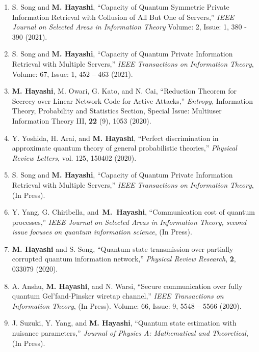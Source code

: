 \documentclass[a4paper,12pt,oneside]{article}
\begin{document}
\begin{enumerate}
\item
S. Song and \textbf{M. Hayashi},
``Capacity of Quantum Symmetric Private Information Retrieval with Collusion of All But One of Servers,''
{\em IEEE Journal on Selected Areas in Information Theory}
Volume: 2, Issue: 1, 380 - 390 (2021).

\item
S. Song and \textbf{M. Hayashi},
``Capacity of Quantum Private Information Retrieval with Multiple Servers,''
{\em IEEE Transactions on Information Theory}, 
Volume: 67, Issue: 1, 452 -- 463 (2021). 

\item 
\textbf{M. Hayashi}, M. Owari, G. Kato, and N. Cai,
``Reduction Theorem for Secrecy over Linear Network
Code for Active Attacks,''
{\em Entropy}, Information Theory, Probability and Statistics Section, Special Issue: Multiuser Information Theory III,  
{\bf 22} (9), 1053 (2020).

\item 
Y. Yoshida, H. Arai, and \textbf{M. Hayashi},
``Perfect discrimination in approximate quantum theory of general probabilistic theories,''
{\em Physical Review Letters}, 
vol. 125, 150402 (2020).

\item 
S. Song and \textbf{M. Hayashi},
``Capacity of Quantum Private Information Retrieval with Multiple Servers,''
{\em IEEE Transactions on Information Theory}, (In Press).

\item
Y. Yang, G. Chiribella,  and~\textbf{M.~Hayashi},
``Communication cost of quantum processes,''
{\em IEEE Journal on Selected Areas in Information Theory, second issue focuses on quantum information science},
(In Press).
 
\item
\textbf{M. Hayashi} and S. Song,
``Quantum state transmission over partially corrupted quantum information network,''
{\em Physical Review Research},  {\bf 2}, 033079 (2020).

\item
A. Anshu, \textbf{M. Hayashi}, and N. Warsi,   
``Secure communication over fully quantum Gel'fand-Pinsker wiretap channel,''
{\em IEEE Transactions on Information Theory}, (In Press).
Volume: 66, Issue: 9, 5548 -- 5566 (2020). 

\item
J. Suzuki, Y. Yang, and \textbf{M. Hayashi},
``Quantum state estimation with nuisance parameters,'' 
{\em Journal of Physics A: Mathematical and Theoretical}, 
(In Press).


\end{enumerate}
\end{document}
